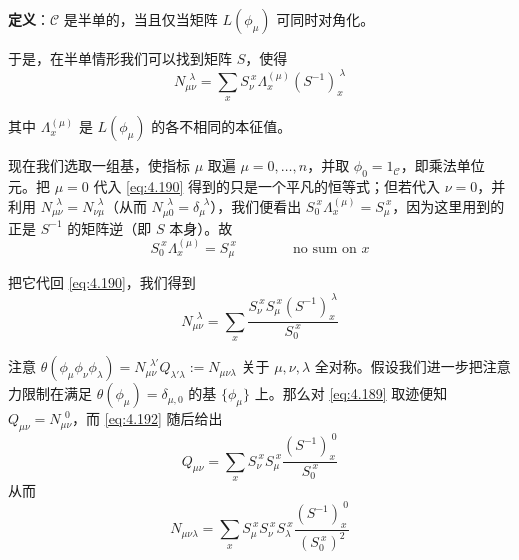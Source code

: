 \textbf{定义}：$\mathcal{C}$ 是半单的，当且仅当矩阵 $L(\phi_\mu)$ 可同时对角化。

于是，在半单情形我们可以找到矩阵 $S$，使得
\begin{equation}
  N_{\mu\nu}^{\ \ \lambda}=\sum_x S_\nu^{\ x}\Lambda_x^{(\mu)}(S^{-1})_x^{\ \lambda}
  \tag{4.190}
  \label{eq:4.190}
\end{equation}

其中 $\Lambda_x^{(\mu)}$ 是 $L(\phi_\mu)$ 的各不相同的本征值。

现在我们选取一组基，使指标 $\mu$ 取遍 $\mu=0,\dots,n$，并取 $\phi_0=1_{\mathcal{C}}$，即乘法单位元。把 $\mu=0$ 代入 \eqref{eq:4.190} 得到的只是一个平凡的恒等式；但若代入 $\nu=0$，并利用 $N_{\mu\nu}^{\ \ \lambda}=N_{\nu\mu}^{\ \ \lambda}$（从而 $N_{\mu 0}^{\ \ \lambda}=\delta_\mu^{\ \ \lambda}$），我们便看出 $S_0^{\ x}\Lambda_x^{(\mu)}=S_\mu^{\ x}$，因为这里用到的正是 $S^{-1}$ 的矩阵逆（即 $S$ 本身）。故
\begin{equation}
  S_0^{\ x}\Lambda_x^{(\mu)}=S_\mu^{\ x}\qquad\qquad\text{no sum on }x
  \tag{4.191}
  \label{eq:4.191}
\end{equation}

把它代回 \eqref{eq:4.190}，我们得到
\begin{equation}
  N_{\mu\nu}^{\ \ \lambda}=\sum_x\frac{S_\nu^{\ x}S_\mu^{\ x}(S^{-1})_x^{\ \lambda}}{S_0^{\ x}}
  \tag{4.192}
  \label{eq:4.192}
\end{equation}

注意 $\theta(\phi_\mu\phi_\nu\phi_\lambda)=N_{\mu\nu}^{\ \ \lambda'}Q_{\lambda'\lambda}:=N_{\mu\nu\lambda}$ 关于 $\mu,\nu,\lambda$ 全对称。假设我们进一步把注意力限制在满足 $\theta(\phi_\mu)=\delta_{\mu,0}$ 的基 $\{\phi_\mu\}$ 上。那么对 \eqref{eq:4.189} 取迹便知 $Q_{\mu\nu}=N_{\mu\nu}^{\ \ 0}$，而 \eqref{eq:4.192} 随后给出
\begin{equation}
  Q_{\mu\nu}=\sum_x S_\nu^{\ x}S_\mu^{\ x}\frac{(S^{-1})_x^{\ 0}}{S_0^{\ x}}
  \tag{4.193}
  \label{eq:4.193}
\end{equation}
从而
\begin{equation}
  N_{\mu\nu\lambda}=\sum_x S_\mu^{\ x}S_\nu^{\ x}S_\lambda^{\ x}\frac{(S^{-1})_x^{\ 0}}{(S_0^{\ x})^2}
  \tag{4.194}
  \label{eq:4.194}
\end{equation}

